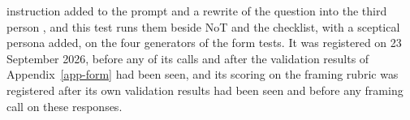 instruction added to the prompt and a rewrite of the question into the
third person \citep{cheng25elephant}, and this test runs them beside NoT and
the checklist, with a sceptical persona added, on the four generators of the
form tests. It was registered on 23 September 2026, before any of its calls
and after the validation results of Appendix~\ref{app-form} had been seen,
and its scoring on the framing rubric was registered after its own
validation results had been seen and before any framing call on these
responses.

